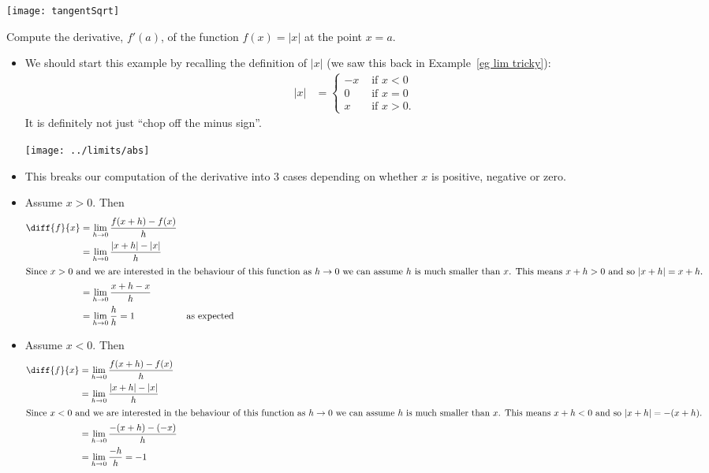 \begin{eg}
\begin{itemize}
\begin{efig}
 \begin{center}
 \texttt{[image: tangentSqrt]}
 \end{center}
\end{efig}

\end{itemize}

\end{eg}

\begin{eg}\label{eg diff abs}
Compute the derivative, $f'(a)$, of the function $f(x)=|x|$ at the point
$x=a$.
\begin{itemize}
 \item We should start this example by recalling the definition of $|x|$ (we
saw this back in Example~\ref{eg lim tricky}):
\begin{align*}
  |x| &= \begin{cases}
	 -x & \text{ if $x<0$}\\
	 0 & \text{ if $x=0$}\\
	 x & \text{ if $x>0$}.
         \end{cases}
\end{align*}
It is definitely not just ``chop off the minus sign''.
\begin{efig}
\begin{center}
\texttt{[image: ../limits/abs]}
\end{center}
\end{efig}


\item This breaks our computation of the derivative into 3 cases depending on
whether $x$ is positive, negative or zero.
\item Assume $x>0$. Then
\begin{align*}
  \diff{f}{x}
  &= \lim_{h\to0} \frac{f(x+h)-f(x)}{h} \\
  &= \lim_{h\to0} \frac{|x+h|-|x|}{h} \\
\intertext{Since $x>0$ and we are interested in the behaviour of this function
as $h \to 0$ we can assume $h$ is much smaller than $x$. This means $x+h>0$ and
so $|x+h|=x+h$.}
  &= \lim_{h\to0} \frac{x+h-x}{h} \\
  &= \lim_{h\to0} \frac{h}{h} = 1 &\text{as expected}
\end{align*}
\item Assume $x<0$. Then
\begin{align*}
  \diff{f}{x}
  &= \lim_{h\to0} \frac{f(x+h)-f(x)}{h} \\
  &= \lim_{h\to0} \frac{|x+h|-|x|}{h} \\
\intertext{Since $x<0$ and we are interested in the behaviour of this function
as $h \to 0$ we can assume $h$ is much smaller than $x$. This means $x+h<0$ and
so $|x+h|=-(x+h)$.}
  &= \lim_{h\to0} \frac{-(x+h)-(-x)}{h} \\
  &= \lim_{h\to0} \frac{-h}{h} = -1
\end{align*}


\end{itemize}
\end{eg}
